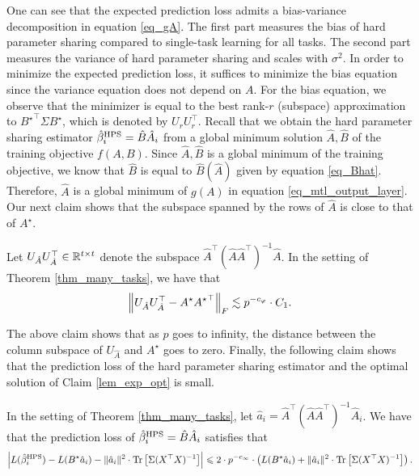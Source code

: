 	One can see that the expected prediction loss admits a bias-variance decomposition in equation \eqref{eq_gA}.
	The first part measures the bias of hard parameter sharing compared to single-task learning for all tasks.
	The second part measures the variance of hard parameter sharing and scales with $\sigma^2$.
	In order to minimize the expected prediction loss, it suffices to minimize the bias equation since the variance equation does not depend on $A$.
	For the bias equation, we observe that the minimizer is equal to the best rank-$r$ (subspace) approximation to ${B^{\star}}^{\top} \Sigma B^{\star}$, which is denoted by $U_{r} U_r^{\top}$.
	Recall that we obtain the hard parameter sharing estimator $\hat{\beta}_i^{\textup{HPS}} = \hat{B} \hat{A}_i$ from a global minimum solution $\hat{A}, \hat{B}$ of the training objective $f(A, B)$.
	Since $\hat{A}, \hat{B}$ is a global minimum of the training objective, we know that $\hat{B}$ is equal to $\hat{B}(\hat{A})$ given by equation \eqref{eq_Bhat}.
	Therefore, $\hat{A}$ is a global minimum of $g(A)$ in equation \eqref{eq_mtl_output_layer}.
	Our next claim shows that the subspace spanned by the rows of $\hat{A}$ is close to that of $A^{\star}$.
	\begin{claim}\label{claim_opt_dist}
		Let $U_{\hat{A}} U_{\hat{A}}^{\top} \in\mathbb{R}^{t\times t}$ denote the subspace $\hat{A}^{\top} (\hat{A}\hat{A}^{\top})^{-1} \hat{A}$.
		In the setting of Theorem \ref{thm_many_tasks}, we have that
		\[ \left\| U_{\hat{A}} U_{\hat{A}}^{\top} - A^{\star} {A^{\star}}^{\top} \right\|_{F}
				\lesssim p^{-c_{\varphi}} \cdot C_1. \]
	\end{claim}
	The above claim shows that as $p$ goes to infinity, the distance between the column subspace of $U_{\hat{A}}$ and ${A^{\star}}$ goes to zero.
	Finally, the following claim shows that the prediction loss of the hard parameter sharing estimator and the optimal solution of Claim \ref{lem_exp_opt} is small.
	\begin{claim}\label{claim_pred_err}
		In the setting of Theorem \ref{thm_many_tasks},
		let $\hat{a}_i = \hat{A}^{\top} (\hat{A}\hat{A}^{\top})^{-1} \hat{A}_i$.
		We have that the prediction loss of $\hat{\beta}_i^{\textup{HPS}} = \hat{B} \hat{A}_i$ satisfies that
		\begin{align*}
			{\left| {L(\hat{\beta}_i^{\textup{HPS}}) - L(B^{\star} \hat{a}_i) - \|\hat{a}_i\|^2 \cdot \operatorname{Tr}\left[\Sigma (X^{\top}X)^{-1}\right]} \right|}
			\leqslant 2\cdot p^{-c_\infty} \cdot \left({L(B^{\star} \hat{a}_i) + \|\hat{a}_i\|^2 \cdot \operatorname{Tr}\left[\Sigma (X^{\top}X)^{-1}\right]}\right).
		\end{align*}
	\end{claim}
